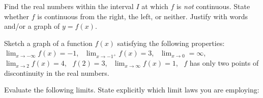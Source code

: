 \documentclass[11pt]{exam}
\DeclarePairedDelimiter\abs{\lvert}{\rvert}%
\begin{document}
\begin{questions}

\vspace*{-130pt}
\addpoints\question\begin{changemargin}{0}{4.85cm} Find the real numbers within the interval $I$ at which $f$ is \emph{not} continuous. State whether $f$ is continuous from the right, the left, or neither. Justify with words and/or a graph of $y=f(x)$.
\end{changemargin}
\newpage
\addpoints
\question[4] Sketch a graph of a function $f(x)$ satisfying the following properties:\\
$\lim_{x\to-\infty}f(x)=-1$,~ $\lim_{x\to -1^+}f(x)=3$,~ $\lim_{x\to 0}=\infty$,~ $\lim_{x\to 2}f(x)=4$,~ $f(2)=3$,~ $\lim_{x\to \infty} f(x)=1$,~ $f$ has only two points of discontinuity in the real numbers. 

\vskip70mm
\addpoints
\question
Evaluate the following limits. State explicitly which limit laws you are employing: 


\end{questions}
\end{document}
